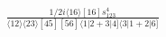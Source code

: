 \documentclass[varwidth, border=5pt]{standalone}
\begin{document}
\begin{my}
$\begin{gathered}
\scriptscriptstyle\frac{1/2i\langle16\rangle[16]s_{123}^4}{\langle12\rangle\langle23\rangle[45][56]\langle1|2+3|4]\langle3|1+2|6]}
\end{gathered}$
\end{my}
\end{document}

